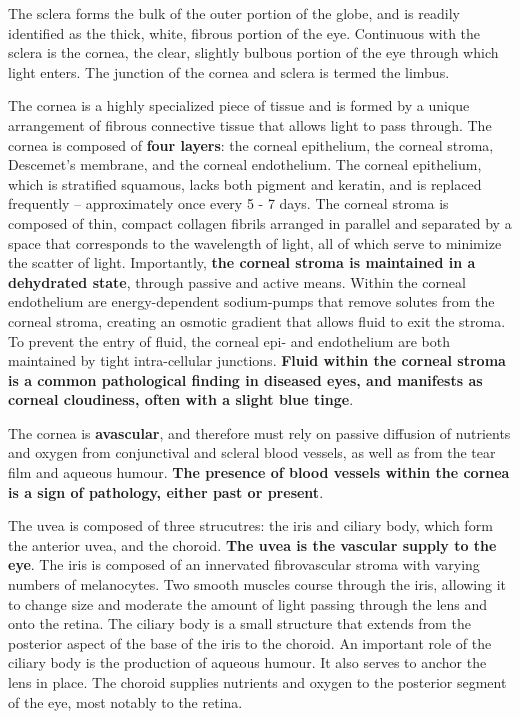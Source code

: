 \documentclass[openany]{article}
\begin{document}
The sclera forms the bulk of the outer portion of the globe, and is
readily identified as the thick, white, fibrous portion of the eye.
Continuous with the sclera is the cornea, the clear, slightly bulbous
portion of the eye through which light enters. The junction of the
cornea and sclera is termed the limbus.

The cornea is a highly specialized piece of tissue and is formed by a
unique arrangement of fibrous connective tissue that allows light to
pass through. The cornea is composed of \textbf{four layers}: the
corneal epithelium, the corneal stroma, Descemet's membrane, and the
corneal endothelium. The corneal epithelium, which is stratified
squamous, lacks both pigment and keratin, and is replaced frequently --
approximately once every 5 - 7 days. The corneal stroma is composed of
thin, compact collagen fibrils arranged in parallel and separated by a
space that corresponds to the wavelength of light, all of which serve to
minimize the scatter of light. Importantly, \textbf{the corneal stroma
is maintained in a dehydrated state}, through passive and active means.
Within the corneal endothelium are energy-dependent sodium-pumps that
remove solutes from the corneal stroma, creating an osmotic gradient
that allows fluid to exit the stroma. To prevent the entry of fluid, the
corneal epi- and endothelium are both maintained by tight intra-cellular
junctions. \textbf{Fluid within the corneal stroma is a common
pathological finding in diseased eyes, and manifests as corneal
cloudiness, often with a slight blue tinge}.

The cornea is \textbf{avascular}, and therefore must rely on passive
diffusion of nutrients and oxygen from conjunctival and scleral blood
vessels, as well as from the tear film and aqueous humour. \textbf{The
presence of blood vessels within the cornea is a sign of pathology,
either past or present}.

The uvea is composed of three strucutres: the iris and ciliary body,
which form the anterior uvea, and the choroid. \textbf{The uvea is the
vascular supply to the eye}. The iris is composed of an innervated
fibrovascular stroma with varying numbers of melanocytes. Two smooth
muscles course through the iris, allowing it to change size and moderate
the amount of light passing through the lens and onto the retina. The
ciliary body is a small structure that extends from the posterior aspect
of the base of the iris to the choroid. An important role of the ciliary
body is the production of aqueous humour. It also serves to anchor the
lens in place. The choroid supplies nutrients and oxygen to the
posterior segment of the eye, most notably to the retina.
\end{document}
